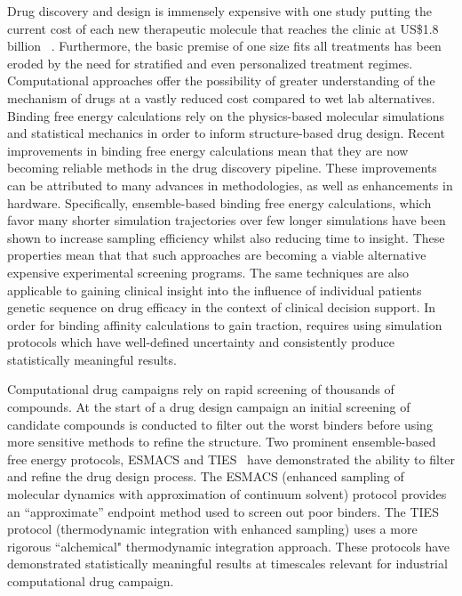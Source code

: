 
Drug discovery and design is immensely expensive with one study putting the current 
cost of each new therapeutic molecule that reaches the clinic at US\$1.8 billion 
~\cite{Paul2010}.
Furthermore, the basic premise of one size fits all treatments has been eroded by the 
need for stratified and even personalized treatment regimes.
Computational approaches offer the possibility of greater understanding of the 
mechanism of drugs at a vastly reduced cost compared to wet lab alternatives.
Binding free energy calculations rely on the physics-based molecular simulations 
and statistical mechanics in order to inform structure-based drug design. 
Recent improvements in binding free energy calculations mean that they are now 
becoming reliable methods in the drug discovery pipeline. 
These improvements can be attributed to many advances in methodologies, as well 
as enhancements in hardware. 
Specifically, ensemble-based  binding free energy calculations, which favor many 
shorter simulation trajectories over few longer simulations have been shown to 
increase sampling efficiency whilst also reducing time to insight.
These properties mean that that such approaches are becoming a viable alternative 
expensive experimental screening programs. 
The same techniques are also applicable to gaining clinical insight into the 
influence of individual patients genetic sequence on drug efficacy in the context 
of clinical decision support. 
In order for binding affinity calculations to gain traction, requires using 
simulation protocols which have well-defined uncertainty and consistently 
produce statistically meaningful results.


Computational drug campaigns rely on rapid screening of thousands of compounds. 
At the start of a drug design campaign an initial screening of candidate 
compounds is conducted to filter out the worst binders before using more 
sensitive methods to refine the structure. 
Two prominent ensemble-based free energy protocols, ESMACS and TIES~\cite{Bhati2017} 
have demonstrated the ability to filter and refine the drug design process. 
The ESMACS (enhanced sampling of molecular dynamics with approximation of continuum 
solvent) protocol provides an ``approximate'' endpoint method used to screen out 
poor binders. 
The TIES protocol (thermodynamic integration with enhanced sampling) uses a more 
rigorous ``alchemical" thermodynamic integration approach. 
These protocols have demonstrated statistically meaningful results at timescales 
relevant for industrial computational drug campaign. 

